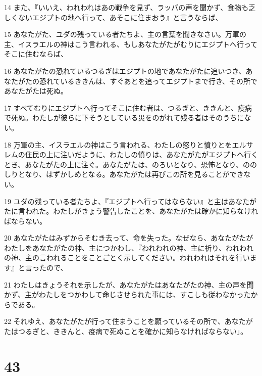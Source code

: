 \par 14 また、『いいえ、われわれはあの戦争を見ず、ラッパの声を聞かず、食物も乏しくないエジプトの地へ行って、あそこに住まおう』と言うならば、
\par 15 あなたがた、ユダの残っている者たちよ、主の言葉を聞きなさい。万軍の主、イスラエルの神はこう言われる、もしあなたがたがむりにエジプトへ行ってそこに住むならば、
\par 16 あなたがたの恐れているつるぎはエジプトの地であなたがたに追いつき、あなたがたの恐れているききんは、すぐあとを追ってエジプトまで行き、その所であなたがたは死ぬ。
\par 17 すべてむりにエジプトへ行ってそこに住む者は、つるぎと、ききんと、疫病で死ぬ。わたしが彼らに下そうとしている災をのがれて残る者はそのうちにない。
\par 18 万軍の主、イスラエルの神はこう言われる、わたしの怒りと憤りとをエルサレムの住民の上に注いだように、わたしの憤りは、あなたがたがエジプトへ行くとき、あなたがたの上に注ぐ。あなたがたは、のろいとなり、恐怖となり、ののしりとなり、はずかしめとなる。あなたがたは再びこの所を見ることができない。
\par 19 ユダの残っている者たちよ、『エジプトへ行ってはならない』と主はあなたがたに言われた。わたしがきょう警告したことを、あなたがたは確かに知らなければならない。
\par 20 あなたがたはみずからそむき去って、命を失った。なぜなら、あなたがたがわたしをあなたがたの神、主につかわし、『われわれの神、主に祈り、われわれの神、主の言われることをことごとく示してください。われわれはそれを行います』と言ったので、
\par 21 わたしはきょうそれを示したが、あなたがたはあなたがたの神、主の声を聞かず、主がわたしをつかわして命じさせられた事には、すこしも従わなかったからである。
\par 22 それゆえ、あなたがたが行って住まうことを願っているその所で、あなたがたはつるぎと、ききんと、疫病で死ぬことを確かに知らなければならない」。

\chapter{43}

